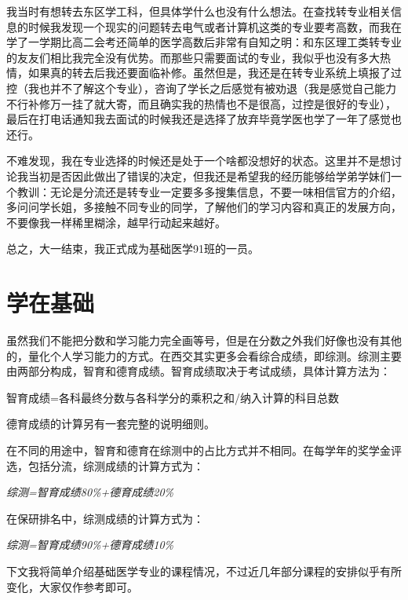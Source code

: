 \documentclass[zihao=-4,fontset=none]{Beautybook-CN}
\begin{document}
我当时有想转去东区学工科，但具体学什么也没有什么想法。在查找转专业相关信息的时候我发现一个现实的问题\textemdash{}\textemdash{}转去电气或者计算机这类的专业要考高数，而我在学了一学期比高二会考还简单的医学高数后非常有自知之明：和东区理工类转专业的友友们相比我完全没有优势。而那些只需要面试的专业，我似乎也没有多大热情，如果真的转去后我还要面临补修。虽然但是，我还是在转专业系统上填报了过控（我也并不了解这个专业），咨询了学长之后感觉有被劝退（我是感觉自己能力不行补修万一挂了就大寄，而且确实我的热情也不是很高，过控是很好的专业），最后在打电话通知我去面试的时候我还是选择了放弃\textemdash{}\textemdash{}毕竟学医也学了一年了感觉也还行。

不难发现，我在专业选择的时候还是处于一个啥都没想好的状态。这里并不是想讨论我当初是否因此做出了错误的决定，但我还是希望我的经历能够给学弟学妹们一个教训：无论是分流还是转专业一定要多多搜集信息，不要一味相信官方的介绍，多问问学长姐，多接触不同专业的同学，了解他们的学习内容和真正的发展方向，不要像我一样稀里糊涂，越早行动起来越好。

总之，大一结束，我正式成为基础医学91班的一员。

\section{学在基础}

虽然我们不能把分数和学习能力完全画等号，但是在分数之外我们好像也没有其他的，量化个人学习能力的方式。在西交其实更多会看综合成绩，即综测。综测主要由两部分构成，智育和德育成绩。智育成绩取决于考试成绩，具体计算方法为：

智育成绩=各科最终分数与各科学分的乘积之和/纳入计算的科目总数

德育成绩的计算另有一套完整的说明细则。

在不同的用途中，智育和德育在综测中的占比方式并不相同。在每学年的奖学金评选，包括分流，综测成绩的计算方式为：

\textit{综测=智育成绩80\%+德育成绩20\%}

在保研排名中，综测成绩的计算方式为：

\textit{综测=智育成绩90\%+德育成绩10\%}

下文我将简单介绍基础医学专业的课程情况，不过近几年部分课程的安排似乎有所变化，大家仅作参考即可。
\end{document}
